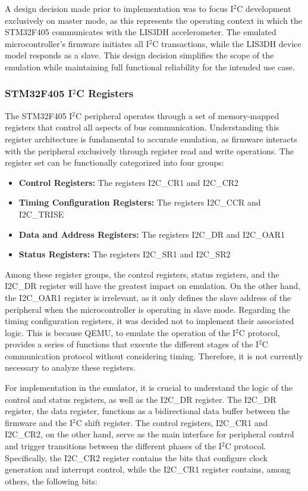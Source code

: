 A design decision made prior to implementation was to focus I$^2$C development 
exclusively on master mode, as this represents the operating context in which the 
STM32F405 communicates with the LIS3DH accelerometer. The emulated 
microcontroller's firmware initiates all I$^2$C transactions, while the LIS3DH device model 
responds as a slave. This design decision simplifies the scope of the emulation while 
maintaining full functional reliability for the intended use case.


\subsubsection{STM32F405 I$^2$C Registers}

The STM32F405 I$^2$C peripheral operates through a set of memory-mapped 
registers that control all aspects of bus communication\cite{STM32F405ReferenceManual2021}. Understanding this register 
architecture is fundamental to accurate emulation, as firmware interacts with the 
peripheral exclusively through register read and write operations. The register set 
can be functionally categorized into four groups:

\begin{itemize}
    \item \textbf{Control Registers:} The registers I2C\_CR1 and I2C\_CR2
    \item \textbf{Timing Configuration Registers:} The registers I2C\_CCR and I2C\_TRISE
    \item \textbf{Data and Address Registers:} The registers I2C\_DR and I2C\_OAR1
    \item \textbf{Status Registers:} The registers I2C\_SR1 and I2C\_SR2
\end{itemize}

Among these register groups, the control registers, status registers, and the 
I2C\_DR register will have the greatest impact on emulation. On the other hand, 
the I2C\_OAR1 register is irrelevant, as it only defines the slave address of the 
peripheral when the microcontroller is operating in slave mode. Regarding the timing 
configuration registers, it was decided not to implement their associated logic. This 
is because QEMU, to emulate the operation of the I$^2$C protocol, provides a series 
of functions that execute the different stages of the I$^2$C communication protocol 
without considering timing. Therefore, it is not currently necessary to analyze 
these registers.

For implementation in the emulator, it is crucial to understand the logic of the 
control and status registers, as well as the I2C\_DR register. The I2C\_DR register, 
the data register, functions as a bidirectional data buffer between the firmware and the 
I$^2$C shift register. The control registers, I2C\_CR1 and I2C\_CR2, on the other hand, 
serve as the main interface for peripheral control and trigger transitions between 
the different phases of the I$^2$C protocol. Specifically, the I2C\_CR2 register contains 
the bits that configure clock generation and interrupt control, while the I2C\_CR1 
register contains, among others, the following bits:

